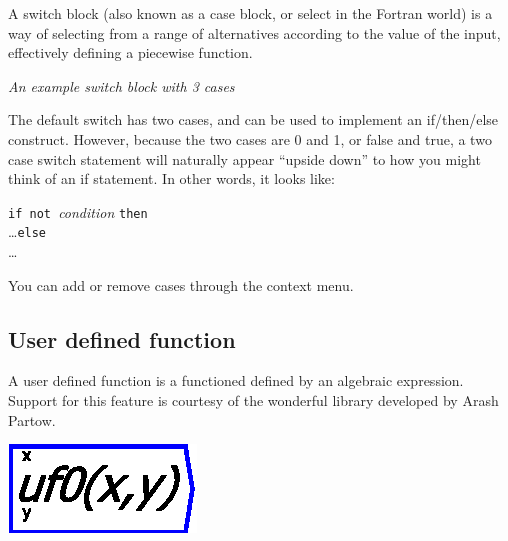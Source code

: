 A switch block (also known as a case block, or select in the Fortran
world) is a way of selecting from a range of alternatives according
to the value of the input, effectively defining a piecewise function.
\begin{center}
 {\em
An example switch block with 3 cases} 
\par\end{center}

The default switch has two cases, and can be used to implement an
if/then/else construct. However, because the two cases are 0 and 1,
or false and true, a two case switch statement will naturally appear
``upside down'' to how you might think of an if statement. In other
words, it looks like:

\noindent\parbox[c]{1\textwidth}{%
 \texttt{if not }{\em condition} \texttt{then}\\
 \ldots\texttt{else}\\
 \ldots %
}

You can add or remove cases through the context menu.

\subsection{User defined function}

\label{Operation:userFunction}\label{UserFunction}

A user defined function is a functioned defined by an algebraic expression.
Support for this feature is courtesy of the wonderful 
library developed by Arash Partow.

\includegraphics{images/userFunction}

